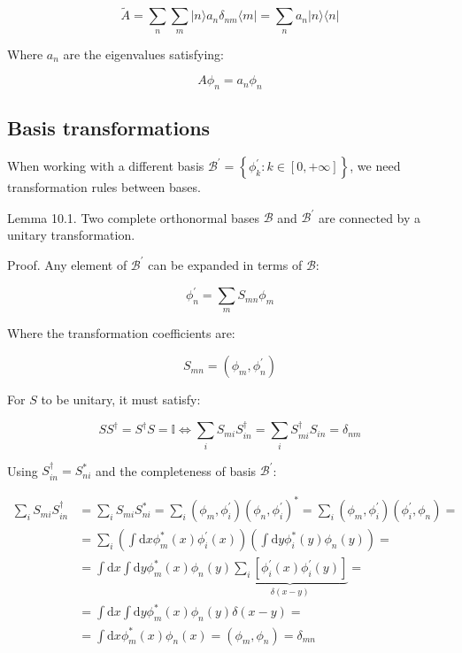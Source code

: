 \documentclass[italian]{HKNdocument}
\begin{document}
\begin{equation}
\tilde{A}=\sum_{n} \sum_{m}|n\rangle a_{n} \delta_{n m}\langle m|=\sum_{n} a_{n}|n\rangle\langle n|
\end{equation}

Where $a_n$ are the eigenvalues satisfying:

\begin{equation}
A \phi_{n}=a_{n} \phi_{n}
\end{equation}

\subsection{Basis transformations}
When working with a different basis $\mathcal{B}^{\prime}=\left\{\phi_{k}^{\prime}: k \in[0,+\infty]\right\}$, we need transformation rules between bases.

Lemma 10.1. Two complete orthonormal bases $\mathcal{B}$ and $\mathcal{B}^{\prime}$ are connected by a unitary transformation.

Proof. Any element of $\mathcal{B}^{\prime}$ can be expanded in terms of $\mathcal{B}$:

\begin{equation}
\phi_{n}^{\prime}=\sum_{m} S_{m n} \phi_{m}
\end{equation}

Where the transformation coefficients are:

\begin{equation}
S_{m n}=\left(\phi_{m}, \phi_{n}^{\prime}\right)
\end{equation}

For $S$ to be unitary, it must satisfy:

\begin{equation}
S S^{\dagger}=S^{\dagger} S=\mathbb{I} \Longleftrightarrow \sum_{i} S_{m i} S_{i n}^{\dagger}=\sum_{i} S_{m i}^{\dagger} S_{i n}=\delta_{n m}
\end{equation}

Using $S_{i n}^{\dagger}=S_{n i}^{*}$ and the completeness of basis $\mathcal{B}^{\prime}$:

\begin{align}
\sum_{i} S_{m i} S_{i n}^{\dagger} & =\sum_{i} S_{m i} S_{n i}^{*}=\sum_{i}\left(\phi_{m}, \phi_{i}^{\prime}\right)\left(\phi_{n}, \phi_{i}^{\prime}\right)^{*}=\sum_{i}\left(\phi_{m}, \phi_{i}^{\prime}\right)\left(\phi_{i}^{\prime}, \phi_{n}\right)= \\
& =\sum_{i}\left(\int \mathrm{d} x \phi_{m}^{*}(x) \phi_{i}^{\prime}(x)\right)\left(\int \mathrm{d} y \phi_{i}^{*}(y) \phi_{n}(y)\right)= \\
& =\int \mathrm{d} x \int \mathrm{d} y \phi_{m}^{*}(x) \phi_{n}(y) \underbrace{\sum_{i}\left[\phi_{i}^{\prime}(x) \phi_{i}^{\prime}(y)\right]}_{\delta(x-y)}= \\
& =\int \mathrm{d} x \int \mathrm{d} y \phi_{m}^{*}(x) \phi_{n}(y) \delta(x-y)= \\
& =\int \mathrm{d} x \phi_{m}^{*}(x) \phi_{n}(x)=\left(\phi_{m}, \phi_{n}\right)=\delta_{m n}
\end{align}
\end{document}
